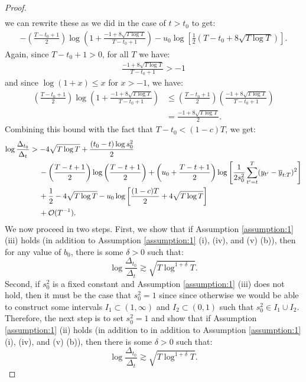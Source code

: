 \begin{proof}
\begin{align*}
\end{align*}
we can rewrite these as we did in the case of $t > t_0$ to get:
\begin{align*}
    - \left(\frac{T - t_0 + 1}{2}\right)\log\left(1 + \frac{-1 + 8\sqrt{T \log T}}{T-t_0+1}\right) - u_0\log\left[\frac{1}{2}(T-t_0 +8\sqrt{T \log T})\right].
\end{align*}
Again, since $T- t_0 + 1 > 0$, for all $T$ we have:
\begin{align*}
    \frac{-1 + 8\sqrt{T \log T}}{T-t_0+1} > -1
\end{align*}
and since $\log(1+x) \leq x$ for $x > -1$, we have:
\begin{align*}
    \left(\frac{T - t_0 + 1}{2}\right)\log\left(1 + \frac{-1 + 8\sqrt{T \log T}}{T-t_0+1}\right)  &\leq \left(\frac{T - t_0 + 1}{2}\right) \left(\frac{-1 + 8\sqrt{T \log T}}{T-t_0+1}\right) \\
    &= \frac{-1 + 8\sqrt{T \log T}}{2}.
\end{align*}
Combining this bound with the fact that $T-t_0 < (1-c)T$, we get:
\begin{align}
    \log \frac{\Delta_{t_0}}{\Delta_t} &> -4\sqrt{T \log T} + \frac{(t_0 - t)\log s_0^2}{2} \notag \\
    &\quad\: - \left(\frac{T - t + 1}{2}\right) \log\left(\frac{T-t+1}{2}\right) + \left(u_0 + \frac{T - t +1}{2}\right)\log\left[ \frac{1}{2s_0^2}\sum_{t'=t}^T (y_{t'} - \overline{y}_{t:T})^2 \right] \notag \\
    &\quad\: + \frac{1}{2} - 4 \sqrt{T \log T} - u_0\log\left[\frac{(1-c)T}{2} + 4\sqrt{T\log T}\right] \notag \\
    &\quad\: +  \mathcal{O}(T^{-1}) \label{eq:thm3-cs2-bd4}. 
\end{align}
We now proceed in two steps. First, we show that if Assumption \ref{assumption:1} (iii) holds (in addition to Assumption \ref{assumption:1} (i), (iv), and (v) (b)), then for any value of $b_0$, there is some $\delta > 0$ such that: $$\log \frac{\Delta_{t_0}}{\Delta_t} \gtrsim \sqrt{T\log^{1+\delta} T}.$$ Second, if $s_0^2$ is a fixed constant and Assumption \ref{assumption:1} (iii) does not hold, then it must be the case that $s_0^2 = 1$ since since otherwise we would be able to construct some intervals $I_1\subset(1,\infty)$ and $I_2\subset(0,1)$ such that $s_0^2 \in I_1\cup I_2$. Therefore, the next step is to set $s_0^2 = 1$ and show that if Assumption \ref{assumption:1} (ii) holds (in addition to in addition to Assumption \ref{assumption:1} (i), (iv), and (v) (b)), then there is some $\delta > 0$ such that: $$\log \frac{\Delta_{t_0}}{\Delta_t} \gtrsim \sqrt{T\log^{1+\delta} T}.$$


\end{proof}
